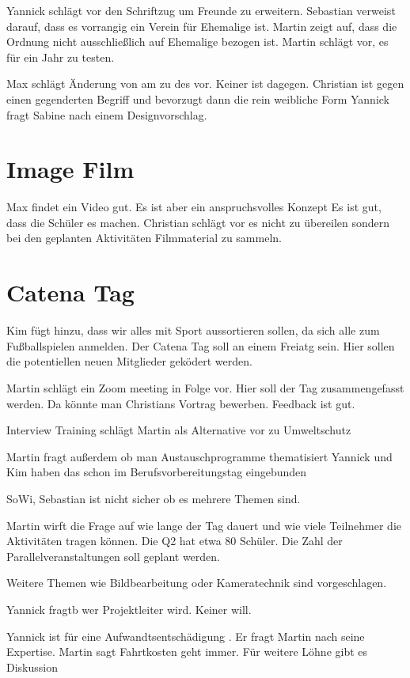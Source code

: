 \documentclass[a4paper, 11pt]{article}
\begin{document}
Yannick schlägt vor den Schriftzug um Freunde zu erweitern.
Sebastian verweist darauf, dass es vorrangig ein Verein für Ehemalige ist.
Martin zeigt auf, dass die Ordnung nicht ausschließlich auf Ehemalige bezogen ist.
Martin schlägt vor, es für ein Jahr zu testen.

Max schlägt Änderung von am zu des vor. Keiner ist dagegen.
Christian ist gegen einen gegenderten Begriff und bevorzugt dann die rein weibliche Form
Yannick fragt Sabine nach einem Designvorschlag.

\section*{Image Film}

Max findet ein Video gut. Es ist aber ein anspruchsvolles Konzept
Es ist gut, dass die Schüler es machen.
Christian schlägt vor es nicht zu übereilen sondern bei den geplanten Aktivitäten Filmmaterial zu sammeln.

\section*{Catena Tag}

Kim fügt hinzu, dass wir alles mit Sport aussortieren sollen, da sich alle zum Fußballspielen anmelden.
Der Catena Tag soll an einem Freiatg sein.
Hier sollen die potentiellen neuen Mitglieder geködert werden.

Martin schlägt ein Zoom meeting in Folge vor. Hier soll der Tag zusammengefasst werden.
Da könnte man Christians Vortrag bewerben.
Feedback ist gut.

Interview Training schlägt Martin als Alternative vor zu Umweltschutz

Martin fragt außerdem ob man Austauschprogramme thematisiert
Yannick und Kim haben das schon im Berufsvorbereitungstag eingebunden

SoWi, Sebastian ist nicht sicher ob es mehrere Themen sind.

Martin wirft die Frage auf wie lange der Tag dauert und wie viele Teilnehmer die Aktivitäten tragen können.
Die Q2 hat etwa 80 Schüler. Die Zahl der Parallelveranstaltungen soll geplant werden.

Weitere Themen wie Bildbearbeitung oder Kameratechnik sind vorgeschlagen.

Yannick fragtb wer Projektleiter wird.
Keiner will.

Yannick ist für eine Aufwandtsentschädigung .
Er fragt Martin nach seine Expertise.
Martin sagt Fahrtkosten geht immer. Für weitere Löhne gibt es Diskussion
\end{document}
